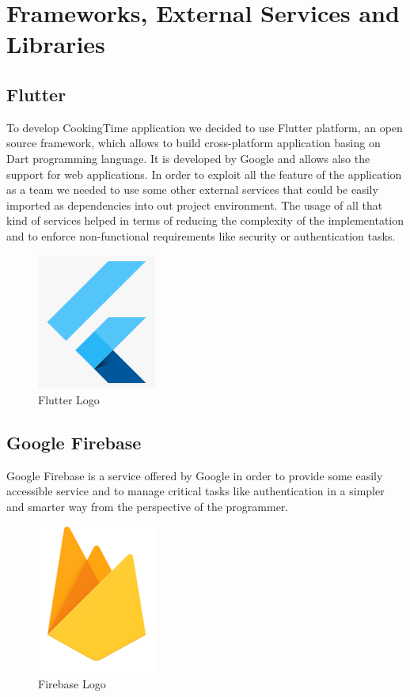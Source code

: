 \chapter{Frameworks, External Services and Libraries}

\section{Flutter}
To develop CookingTime application we decided to use Flutter platform, an open source framework, which allows to build cross-platform application basing on Dart programming language. It is developed by Google and allows also the support for web applications.
In order to exploit all the feature of the application as a team we needed to use some other external services that could be easily imported as dependencies into out project environment. 
The usage of all that kind of services helped in terms of reducing the complexity of the implementation and to enforce non-functional requirements like security or authentication tasks.
\begin{figure}[H]
		\begin{center}
			\centering
			\includegraphics[width=0.35\textwidth]{img/flutterLogo.png}
			\caption{Flutter Logo}
		\end{center}
	\end{figure}
\section{Google Firebase}
Google Firebase is a service offered by Google in order to provide some easily accessible service and to manage critical tasks like authentication in a simpler and smarter way from the perspective of the programmer.
\begin{figure}[H]
		\begin{center}
			\centering
			\includegraphics[width=0.35\textwidth]{img/firebaseLogo.png}
			\caption{Firebase Logo}
		\end{center}
	\end{figure}
